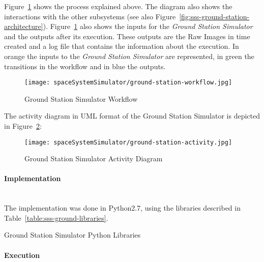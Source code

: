 Figure~\ref{fig:sss-ground-station-workflow} shows the process explained above. The diagram also shows the interactions with the other subsystems (see also Figure~\ref{fig:sss-ground-station-architecture}). Figure~\ref{fig:sss-ground-station-workflow} also shows the inputs for the \emph{Ground Station Simulator} and the outputs after its execution. These outputs are the Raw Images in time created and a log file that contains the information about the execution. In orange the inputs to the \emph{Ground Station Simulator} are represented, in green the transitions in the workflow and in blue the outputs.

\begin{figure}[!h]
\begin{center}
\texttt{[image: spaceSystemSimulator/ground-station-workflow.jpg]}
\caption{Ground Station Simulator Workflow}
\label{fig:sss-ground-station-workflow}
\end{center}
\end{figure}

The activity diagram in UML format of the Ground Station Simulator is depicted
in Figure~\ref{fig:sss-ground-station-activity}:

\begin{figure}[!h]
\begin{center}
\texttt{[image: spaceSystemSimulator/ground-station-activity.jpg]}
\caption{Ground Station Simulator Activity Diagram}
\label{fig:sss-ground-station-activity}
\end{center}
\end{figure}

\paragraph{Implementation}\label{par:sss-ground-implementation}~\\

The implementation was done in Python2.7, using the libraries described in Table~\ref{table:sss-ground-libraries}.

\begin{table}[hp]
  \centering
  {\small
  
  }
  \caption{Ground Station Simulator Python Libraries}
  \label{table:sss-ground-libraries}
\end{table}

\paragraph{Execution}\label{par:sss-ground-execution}~\\

